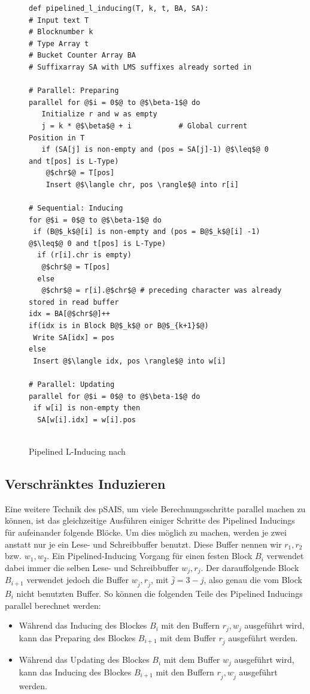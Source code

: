 \begin{figure}
\begin{verbatim}
def pipelined_l_inducing(T, k, t, BA, SA):
# Input text T
# Blocknumber k
# Type Array t
# Bucket Counter Array BA
# Suffixarray SA with LMS suffixes already sorted in

# Parallel: Preparing
parallel for @$i = 0$@ to @$\beta-1$@ do 
   Initialize r and w as empty
   j = k * @$\beta$@ + i 	       # Global current Position in T
   if (SA[j] is non-empty and (pos = SA[j]-1) @$\leq$@ 0 and t[pos] is L-Type)
    @$chr$@ = T[pos]
    Insert @$\langle chr, pos \rangle$@ into r[i]
		
# Sequential: Inducing
for @$i = 0$@ to @$\beta-1$@ do 
 if (B@$_k$@[i] is non-empty and (pos = B@$_k$@[i] -1)  @$\leq$@ 0 and t[pos] is L-Type)
  if (r[i].chr is empty)
   @$chr$@ = T[pos]
  else
   @$chr$@ = r[i].@$chr$@ # preceding character was already stored in read buffer
idx = BA[@$chr$@]++
if(idx is in Block B@$_k$@ or B@$_{k+1}$@)
 Write SA[idx] = pos
else
 Insert @$\langle idx, pos \rangle$@ into w[i]
 
# Parallel: Updating
parallel for @$i = 0$@ to @$\beta-1$@ do
 if w[i] is non-empty then
  SA[w[i].idx] = w[i].pos


\end{verbatim}
\caption{Pipelined L-Inducing nach \cite{psais}}
\label{pipL}
\end{figure}

\subsection{Verschränktes Induzieren}

Eine weitere Technik des pSAIS, um viele Berechnungsschritte parallel machen zu können, ist das gleichzeitige Ausführen einiger Schritte des Pipelined Inducings für aufeinander folgende Blöcke. Um dies möglich zu machen, werden je zwei anstatt nur je ein Lese- und Schreibbuffer benutzt. Diese Buffer nennen wir $r_1, r_2$ bzw. $w_1, w_2$. Ein Pipelined-Inducing Vorgang für einen festen Block $B_i$ verwendet dabei immer die selben Lese- und Schreibbuffer $w_j, r_j$. Der darauffolgende Block $B_{i+1}$ verwendet jedoch die Buffer $w_{\bar j}, r_{\bar j}$, mit $\bar j = 3 - j$, also genau die vom Block $B_i$ nicht benutzten Buffer. So können die folgenden Teile des Pipelined Inducings parallel berechnet werden:

\begin{itemize}
\item Während das Inducing des Blockes $B_i$ mit den Buffern $r_j, w_j$ ausgeführt wird, kann das Preparing des Blockes $B_{i+1}$ mit dem Buffer $r_{\bar{j}}$ ausgeführt werden.
\item Während das Updating des Blockes $B_i$ mit dem Buffer $w_j$ ausgeführt wird, kann das Inducing des Blockes $B_{i+1}$ mit den Buffern $r_{\bar{j}}, w_{\bar{j}}$ ausgeführt werden.
\end{itemize}

